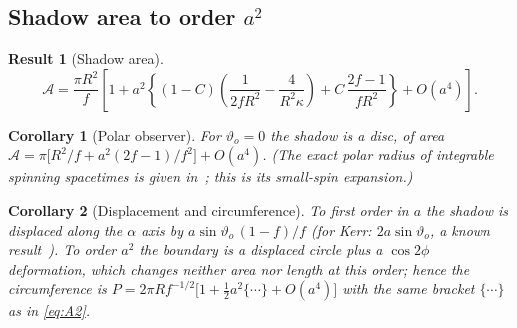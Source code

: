 \documentclass[11pt,a4paper]{article}
\newtheorem{result}{Result}
\newtheorem{corollary}{Corollary}
\theoremstyle{remark}
\numberwithin{equation}{section}
\begin{document}
\subsection{Shadow area to order \texorpdfstring{$a^2$}{a2}}
\begin{result}[Shadow area]\label{res:A2}
\begin{equation}
\mathcal A=\frac{\pi R^2}{f}\left[1+a^2\left\{(1-C)\left(\frac{1}{2fR^2}-\frac{4}{R^2\kappa}\right)
+C\,\frac{2f-1}{fR^2}\right\}+O(a^4)\right].
\label{eq:A2}
\end{equation}
\end{result}
\begin{corollary}[Polar observer]
For $\vartheta_o=0$ the shadow is a disc, of area
$\mathcal A=\pi\big[R^2/f+a^2(2f-1)/f^2\big]+O(a^4)$. (The exact polar radius of integrable
spinning spacetimes is given in~\cite{Salehi2024}; this is its small-spin expansion.)
\end{corollary}
\begin{corollary}[Displacement and circumference]
To first order in $a$ the shadow is displaced along the $\alpha$ axis by $a\sin\vartheta_o\,(1-f)/f$
(for Kerr: $2a\sin\vartheta_o$, a known result~\cite{Bozza2006,GrallaLupsasca2020shape}). To order $a^2$ the boundary is a displaced circle plus a
$\cos2\phi$ deformation, which changes neither area nor length at this order; hence the
circumference is $P=2\pi R f^{-1/2}\big[1+\tfrac12 a^2\{\cdots\}+O(a^4)\big]$ with the same bracket
$\{\cdots\}$ as in \eqref{eq:A2}.
\end{corollary}
\end{document}
